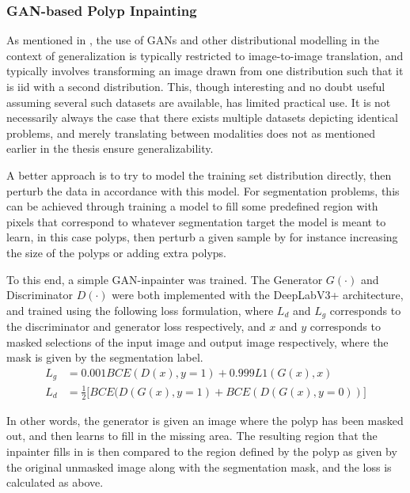 \subsubsection{GAN-based Polyp Inpainting}
As mentioned in , the use of GANs and other distributional modelling in the context of generalization is typically restricted to image-to-image translation, and typically involves transforming an image drawn from one distribution such that it is \gls{iid} with a second distribution. This, though interesting and no doubt useful assuming several such datasets are available, has limited practical use. It is not necessarily always the case that there exists multiple datasets depicting identical problems, and merely translating between modalities does not as mentioned earlier in the thesis ensure generalizability.

A better approach is to try to model the training set distribution directly, then perturb the data in accordance with this model. For segmentation problems, this can be achieved through training a model to fill some predefined region with pixels that correspond to whatever segmentation target the model is meant to learn, in this case polyps, then perturb a given sample by for instance increasing the size of the polyps or adding extra polyps.

To this end, a simple GAN-inpainter was trained. The Generator \(G(\cdot)\) and Discriminator \(D(\cdot)\) were both implemented with the DeepLabV3+ architecture, and trained using the following loss formulation, where \(L_d\) and \(L_g\) corresponds to the discriminator and generator loss respectively, and \(x\) and \(y\) corresponds to masked selections of the input image and output image respectively, where the mask is given by the segmentation label. 
\begin{align}
    L_g &= 0.001 BCE(D(x),y=1) + 0.999 L1(G(x), x) \\
    L_d &= \frac{1}{2}\big[ BCE(D(G(x),y=1)+BCE(D(G(x), y=0)) \big]
\end{align}

In other words, the generator is given an image where the polyp has been masked out, and then learns to fill in the missing area. The resulting region that the inpainter fills in is then compared to the region defined by the polyp as given by the original unmasked image along with the segmentation mask, and the loss is calculated as above.


